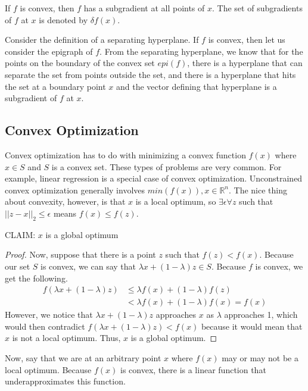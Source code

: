 \documentclass[11pt]{article}
\begin{document}
\begin{corollary}
If $f$ is convex, then $f$ has a subgradient at all points of $x$.  The set of subgradients of $f$ at $x$ is denoted by $\delta f(x)$.
\end{corollary}

Consider the definition of a separating hyperplane.  If $f$ is convex, then let us consider the epigraph of $f$.  From the separating hyperplane, we know that for the points on the boundary of the convex set $epi(f)$, there is a hyperplane that can separate the set from points outside the set, and there is a hyperplane that hits the set at a boundary point $x$ and the vector defining that hyperplane is a subgradient of $f$ at $x$.

\subsection{Convex Optimization}
Convex optimization has to do with minimizing a convex function $f(x)$ where $x \in S$ and $S$ is a convex set.  These types of problems are very common.  For example, linear regression is a special case of convex optimization.  Unconstrained convex optimization generally involves $min(f(x)), x\in \mathbb{R}^{n}$.  The nice thing about convexity, however, is that $x$ is a local optimum, so $\exists \epsilon \forall z$ such that $||z-x||_{2} \leq \epsilon$ means $f(x) \leq f(z)$.\\

\smallskip


CLAIM: $x$ is a global optimum
\begin{proof}
Now, suppose that there is a point $z$ such that $f(z) < f(x)$.  Because our set $S$ is convex, we can say that $\lambda x + (1- \lambda)z \in S$.  Because $f$ is convex, we get the following.
\begin{align*}
f(\lambda x + (1-\lambda) z) &\leq \lambda f(x) + (1-\lambda)f(z)\\
&< \lambda f(x) + (1-\lambda)f(x) = f(x)
\end{align*}
However, we notice that $\lambda x + (1- \lambda)z$ approaches $x$ as $\lambda$ approaches 1, which would then contradict $f(\lambda x + (1-\lambda) z) < f(x)$ because it would mean that $x$ is not a local optimum.  Thus, $x$ is a global optimum.
\end{proof}

Now, say that we are at an arbitrary point $x$ where $f(x)$ may or may not be a local optimum.  Because $f(x)$ is convex, there is a linear function that underapproximates this function.
\end{document}
